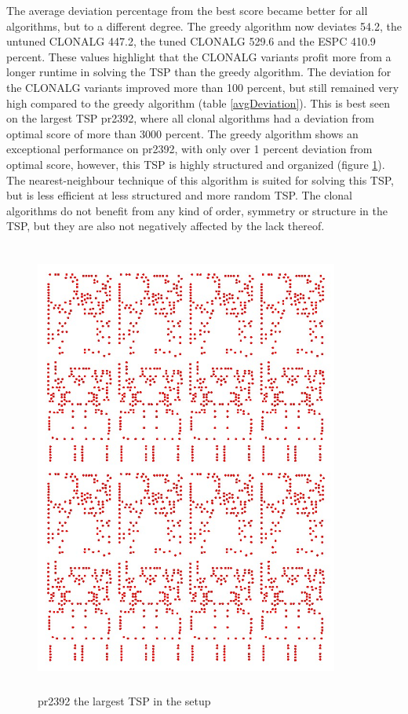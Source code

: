 The average deviation percentage from the best score became better for all algorithms, but to a different degree. The greedy algorithm now deviates 54.2, the untuned CLONALG 447.2, the tuned CLONALG 529.6 and the ESPC 410.9 percent. These values highlight that the CLONALG variants profit more from a longer runtime in solving the TSP than the greedy algorithm. The deviation for the CLONALG variants improved more than 100 percent, but still remained very high compared to the greedy algorithm (table \ref{avgDeviation}). This is best seen on the largest TSP pr2392, where all clonal algorithms had a deviation from optimal score of more than 3000 percent. The greedy algorithm shows an exceptional performance on pr2392, with only over 1 percent deviation from optimal score, however, this TSP is highly structured and organized (figure \ref{pr2392}). The nearest-neighbour technique of this algorithm is suited for solving this TSP, but is less efficient at less structured and more random TSP. The clonal algorithms do not benefit from any kind of order, symmetry or structure in the TSP, but they are also not negatively affected by the lack thereof. 
\begin{figure}[H]
	\includegraphics[width=10cm, height=15cm]{Images/pr2392.jpg}
	\caption{pr2392 the largest TSP in the setup}
	\label{pr2392}
\end{figure}
